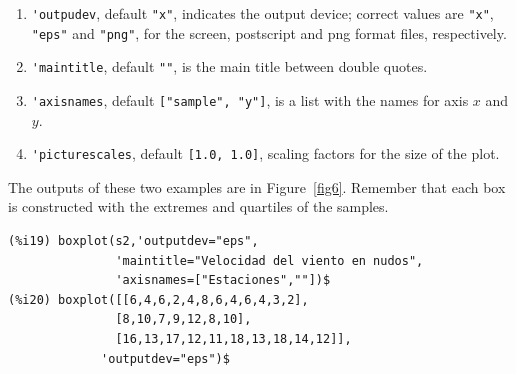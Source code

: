 \documentclass[12pt,a4paper]{article}
\begin{document}
\begin{description}
\begin{enumerate}
\item \verb|'outpudev|, default \verb|"x"|, indicates the output device; correct values are \verb|"x"|, \verb|"eps"| and \verb|"png"|, for the screen, postscript and png format files, respectively.
\item \verb|'maintitle|, default \verb|""|, is the main title between double quotes.
\item \verb|'axisnames|, default \verb|["sample", "y"]|, is a list with the names for axis $x$ and $y$.
\item \verb|'picturescales|, default \verb|[1.0, 1.0]|, scaling factors for the size of the plot.
\end{enumerate}

The outputs of these two examples are in Figure~\ref{fig6}. Remember that each box is constructed with the extremes and quartiles of the samples.
\begin{verbatim}
(%i19) boxplot(s2,'outputdev="eps",
               'maintitle="Velocidad del viento en nudos",
               'axisnames=["Estaciones",""])$
(%i20) boxplot([[6,4,6,2,4,8,6,4,6,4,3,2],
               [8,10,7,9,12,8,10],
               [16,13,17,12,11,18,13,18,14,12]],
             'outputdev="eps")$
\end{verbatim}



\end{description}
\end{document}
